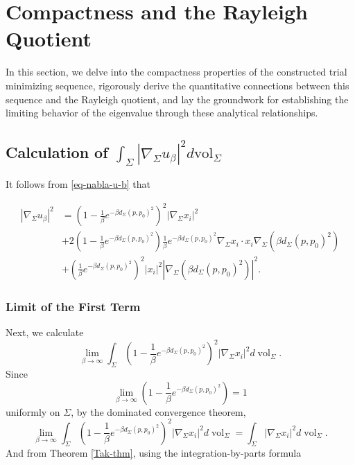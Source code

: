 \documentclass[a4, 12pt]{amsart}
\numberwithin{equation}{section} \numberwithin{equation}{section}
\begin{document}
\section{Compactness and the Rayleigh Quotient}\label{Compactness and the Rayleigh Quotient}
In this section, we delve into the compactness properties of the constructed trial minimizing sequence, rigorously derive the quantitative connections between this sequence and the Rayleigh quotient, and lay the groundwork for establishing the limiting behavior of the eigenvalue through these analytical relationships.
\subsection{Calculation of $\int_{\Sigma}\left|\nabla_{\Sigma} u_{\beta}\right|^{2} d \mathrm{vol}_{\Sigma}$}

It follows from \eqref{eq-nabla-u-b} that

\begin{equation}
\begin{aligned}
\left|\nabla_{\Sigma} u_{\beta}\right|^{2} & =\left(1-\frac{1}{\beta} e^{-\beta d_{\Sigma}\left(p, p_{0}\right)^{2}}\right)^{2}\left|\nabla_{\Sigma} x_{i}\right|^{2}\\&+2\left(1-\frac{1}{\beta} e^{-\beta d_{\Sigma}\left(p, p_{0}\right)^{2}}\right) \frac{1}{\beta} e^{-\beta d_{\Sigma}\left(p, p_{0}\right)^{2}} \nabla_{\Sigma} x_{i} \cdot x_{i} \nabla_{\Sigma}\left(\beta d_{\Sigma}\left(p, p_{0}\right)^{2}\right) \\
& +\left(\frac{1}{\beta} e^{-\beta d_{\Sigma}\left(p, p_{0}\right)^{2}}\right)^{2}\left|x_{i}\right|^{2}\left|\nabla_{\Sigma}\left(\beta d_{\Sigma}\left(p, p_{0}\right)^{2}\right)\right|^{2}.
\end{aligned}
\end{equation}



\subsubsection{Limit of the First Term}

Next, we calculate
\begin{equation*}\lim _{\beta \rightarrow \infty} \int_{\Sigma}\left(1-\frac{1}{\beta} e^{-\beta d_{\Sigma}\left(p, p_{0}\right)^{2}}\right)^{2}\left|\nabla_{\Sigma} x_{i}\right|^{2} d \operatorname{vol}_{\Sigma}.\end{equation*} Since
\begin{equation*}\lim _{\beta \rightarrow \infty}\left(1-\frac{1}{\beta} e^{-\beta d_{\Sigma}\left(p, p_{0}\right)^{2}}\right)=1\end{equation*} uniformly on $\Sigma$, by the dominated convergence theorem,
\begin{equation*}\lim _{\beta \rightarrow \infty} \int_{\Sigma}\left(1-\frac{1}{\beta} e^{-\beta d_{\Sigma}\left(p, p_{0}\right)^{2}}\right)^{2}\left|\nabla_{\Sigma} x_{i}\right|^{2} d \operatorname{vol}_{\Sigma}=\int_{\Sigma}\left|\nabla_{\Sigma} x_{i}\right|^{2} d \operatorname{vol} _{\Sigma}.\end{equation*}
And from Theorem \ref{Tak-thm}, using the integration-by-parts formula
\end{document}
